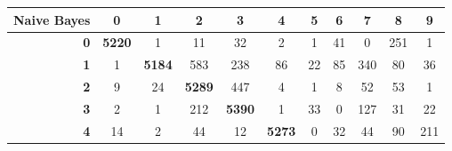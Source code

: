 \documentclass[
	12pt,				%
	openright,			%
	twoside,			%
	a4paper,			%
	english,			%
	brazil,				%
	svgnames
	]{abntex2}\usepackage[]{graphicx}\usepackage[]{color}
\begin{document}
\begin{table}[h]
\begin{tabular}{rcccccccccc}
\multicolumn{1}{c|}{\textbf{Naive Bayes}} & \textbf{0}                         & \textbf{1}                         & \textbf{2}                         & \textbf{3}                         & \textbf{4}                         & \textbf{5}                         & \textbf{6}                         & \textbf{7}                         & \textbf{8}                         & \textbf{9}                         \\ \hline
\multicolumn{1}{r|}{\textbf{0}}           & \multicolumn{1}{c|}{\textbf{5220}} & 1                                  & 11                                 & 32                                 & 2                                  & 1                                  & 41                                 & 0                                  & 251                                & 1                                  \\ \cline{2-3}
\multicolumn{1}{r|}{\textbf{1}}           & \multicolumn{1}{c|}{1}             & \multicolumn{1}{c|}{\textbf{5184}} & 583                                & 238                                & 86                                 & 22                                 & 85                                 & 340                                & 80                                 & 36                                 \\ \cline{3-4}
\multicolumn{1}{r|}{\textbf{2}}           & 9                                  & \multicolumn{1}{c|}{24}            & \multicolumn{1}{c|}{\textbf{5289}} & 447                                & 4                                  & 1                                  & 8                                  & 52                                 & 53                                 & 1                                  \\ \cline{4-5}
\multicolumn{1}{r|}{\textbf{3}}           & 2                                  & 1                                  & \multicolumn{1}{c|}{212}           & \multicolumn{1}{c|}{\textbf{5390}} & 1                                  & 33                                 & 0                                  & 127                                & 31                                 & 22                                 \\ \cline{5-6}
\multicolumn{1}{r|}{\textbf{4}}           & 14                                 & 2                                  & 44                                 & \multicolumn{1}{c|}{12}            & \multicolumn{1}{c|}{\textbf{5273}} & 0                                  & 32                                 & 44                                 & 90                                 & 211                                \\ \cline{6-7}

\end{tabular}
\end{table}
\end{document}
